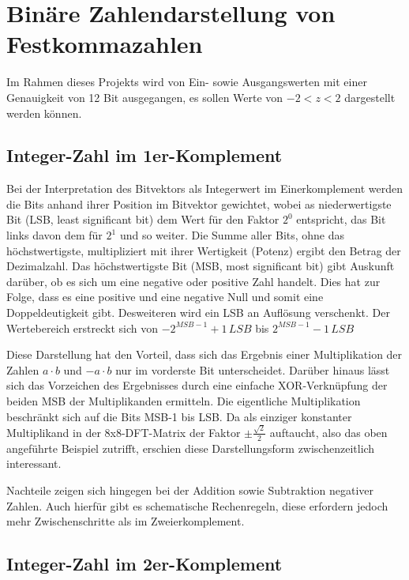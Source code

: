 \section{Binäre Zahlendarstellung von Festkommazahlen}

Im Rahmen dieses Projekts wird von Ein- sowie Ausgangswerten mit einer Genauigkeit von 12 Bit ausgegangen, es sollen Werte von $-2 < z < 2$ dargestellt werden können. 




\subsection{Integer-Zahl im 1er-Komplement}
Bei der Interpretation des Bitvektors als Integerwert im Einerkomplement werden die Bits anhand ihrer Position im Bitvektor gewichtet, wobei as niederwertigste Bit 
(LSB, least significant bit) dem Wert für den Faktor $2^0$ entspricht, das Bit links davon dem für $2^1$ und so weiter. Die Summe aller Bits, ohne das höchstwertigste, 
multipliziert mit ihrer Wertigkeit (Potenz) ergibt den Betrag der Dezimalzahl. Das höchstwertigste Bit (MSB, most significant bit) gibt Auskunft darüber, ob es sich 
um eine negative oder positive Zahl handelt. Dies hat zur Folge, dass es eine positive und eine negative Null und somit eine Doppeldeutigkeit gibt. Desweiteren wird
ein LSB an Auflösung verschenkt. Der Wertebereich erstreckt sich von $-2^{MSB-1}+1\,LSB$ bis $2^{MSB-1}-1\,LSB$

Diese Darstellung hat den Vorteil, dass sich das Ergebnis einer Multiplikation der Zahlen $a \cdot b$ und $-a \cdot b$ nur im vorderste Bit unterscheidet. Darüber hinaus
lässt sich das Vorzeichen des Ergebnisses durch eine einfache XOR-Verknüpfung der beiden MSB der Multiplikanden ermitteln. 
Die eigentliche Multiplikation beschränkt sich auf die Bits MSB-1 bis LSB.
Da als einziger konstanter Multiplikand in der 8x8-DFT-Matrix der Faktor $\pm\frac{\sqrt{2}}{2}$ auftaucht, also das oben angeführte Beispiel zutrifft, erschien diese
Darstellungsform zwischenzeitlich interessant.

Nachteile zeigen sich hingegen bei der Addition sowie Subtraktion negativer Zahlen. Auch hierfür gibt es schematische Rechenregeln, diese erfordern jedoch mehr 
Zwischenschritte als im Zweierkomplement. 


\subsection{Integer-Zahl im 2er-Komplement}\label{sec:Integer2erKomplement}

